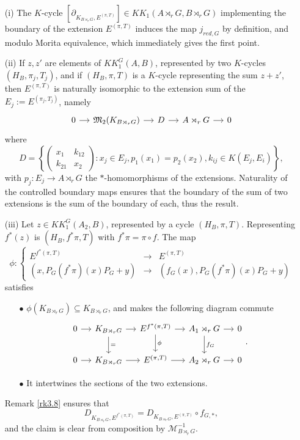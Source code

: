 \begin{dem}
\begin{enumerate}

\item[(i)]The $K$-cycle $[\partial_{K_{B\rtimes_r G},E^{(\pi,T)}}]\in KK_1(A\rtimes_r G, B\rtimes_r G)$ implementing the boundary of the extension $E^{(\pi,T)}$ induces the map $j_{red,G}$ by definition, and modulo Morita equivalence, which immediately gives the first point.

\item[(ii)] If $z,z'$ are elements of $KK_1^G(A,B)$, represented by two $K$-cycles $(H_B,\pi_j,T_j)$, and if $(H_B,\pi,T)$ is a $K$-cycle representing the sum $z+z'$, then $E^{(\pi,T)}$ is naturally isomorphic to the extension sum of the $E_j:=E^{(\pi_j,T_j)}$, namely
\[\begin{tikzcd}[column sep = small]
0\arrow{r} & \mathfrak M_2(K_{B\rtimes_r G}) \arrow{r} & D \arrow{r} & A\rtimes_r G \arrow{r} & 0
\end{tikzcd}\]
where 
\[D=\left\{\begin{pmatrix}x_1 & k_{12}\\ k_{21} & x_2\end{pmatrix} : x_j\in E_j , p_1(x_1)=p_2(x_2), k_{ij}\in K(E_j,E_i)\right\},\]
with $p_j : E_j\rightarrow A\rtimes_r G$ the $*$-homomorphisms of the extensions.
Naturality of the controlled boundary maps \cite{OY2} ensures that the boundary of the sum of two extensions is the sum of the boundary of each, thus the result.
\item[(iii)] Let $z\in KK_1^G(A_2,B)$, represented by a cycle $(H_B,\pi,T)$. Representing $f^*(z)$ is $(H_B,f^*\pi,T)$ with $f^*\pi=\pi \circ f$. The map 
\[\phi : \left\{\begin{array}{lll} E^{f^*(\pi,T)} & \rightarrow & E^{(\pi,T)} \\
( x, P_G(f^*\pi)(x)P_G+y) & \rightarrow & ( f_G(x), P_G(f^*\pi)(x)P_G+y) \end{array}\right. \]
satisfies
\begin{enumerate}
\item[$\bullet$] $\phi(K_{B\rtimes_r G})\subseteq K_{B\rtimes_r G}$, and makes the following diagram commute
\[\begin{tikzcd}[column sep = small]
0\arrow{r} & K_{B\rtimes_r G}\arrow{r}\arrow{d}{=} & E^{f^*(\pi,T)} \arrow{r}\arrow{d}{\phi}& A_1\rtimes_r G\arrow{r}\arrow{d}{f_G} & 0\\
0\arrow{r} & K_{B\rtimes_r G}\arrow{r} & E^{(\pi,T)} \arrow{r}& A_2\rtimes_r G\arrow{r} & 0
\end{tikzcd}.\]
\item[$\bullet$] It intertwines the sections of the two extensions.
\end{enumerate}
Remark \ref{rk3.8} ensures that \[D_{K_{B\rtimes_r G}, E^{f^*(\pi,T)} } =  D_{K_{B\rtimes_r G}, E^{(\pi,T)} }\circ f_{G,*},\] and the claim is clear from composition by $\mathcal M_{B\rtimes_r G}^{-1}$.


\end{enumerate}
\end{dem}
